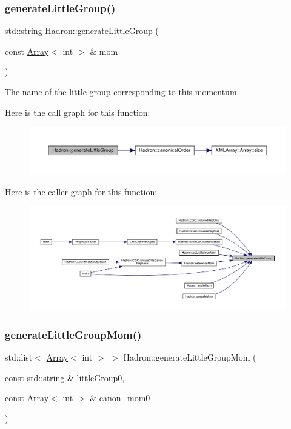 \subsubsection{\texorpdfstring{generateLittleGroup()}{generateLittleGroup()}}
{\footnotesize\ttfamily std\+::string Hadron\+::generate\+Little\+Group (\begin{DoxyParamCaption}\item[{const \mbox{\hyperlink{classXMLArray_1_1Array}{Array}}$<$ int $>$ \&}]{mom }\end{DoxyParamCaption})}



The name of the little group corresponding to this momentum. 

Here is the call graph for this function\+:
\nopagebreak
\begin{figure}[H]
\begin{center}
\leavevmode
\includegraphics[width=350pt]{d1/daf/namespaceHadron_a511bab858a88c02ec88a697fd5430e0d_cgraph}
\end{center}
\end{figure}
Here is the caller graph for this function\+:
\nopagebreak
\begin{figure}[H]
\begin{center}
\leavevmode
\includegraphics[width=350pt]{d1/daf/namespaceHadron_a511bab858a88c02ec88a697fd5430e0d_icgraph}
\end{center}
\end{figure}
\mbox{\label{namespaceHadron_a12d4f9d40cac2700ebb7a7420f20987b}} 
\subsubsection{\texorpdfstring{generateLittleGroupMom()}{generateLittleGroupMom()}}
{\footnotesize\ttfamily std\+::list$<$ \mbox{\hyperlink{classXMLArray_1_1Array}{Array}}$<$ int $>$ $>$ Hadron\+::generate\+Little\+Group\+Mom (\begin{DoxyParamCaption}\item[{const std\+::string \&}]{little\+Group0,  }\item[{const \mbox{\hyperlink{classXMLArray_1_1Array}{Array}}$<$ int $>$ \&}]{canon\+\_\+mom0 }\end{DoxyParamCaption})}



